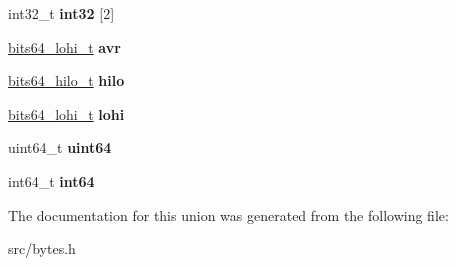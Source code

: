\begin{DoxyCompactItemize}
\item 
int32\+\_\+t {\bfseries int32} \mbox{[}2\mbox{]}\hypertarget{unionbits64__s_a5a6e3c19e144a66c4923c3ea47d9bb23}{}\label{unionbits64__s_a5a6e3c19e144a66c4923c3ea47d9bb23}

\item 
\hyperlink{structbits64__lohi__s}{bits64\+\_\+lohi\+\_\+t} {\bfseries avr}\hypertarget{unionbits64__s_a6b815502e09f58865868c040d132d809}{}\label{unionbits64__s_a6b815502e09f58865868c040d132d809}

\item 
\hyperlink{structbits64__hilo__s}{bits64\+\_\+hilo\+\_\+t} {\bfseries hilo}\hypertarget{unionbits64__s_acd5f277340bd777ff42bcc13c52c6081}{}\label{unionbits64__s_acd5f277340bd777ff42bcc13c52c6081}

\item 
\hyperlink{structbits64__lohi__s}{bits64\+\_\+lohi\+\_\+t} {\bfseries lohi}\hypertarget{unionbits64__s_a2d07870fec9fb72486013721a461acc1}{}\label{unionbits64__s_a2d07870fec9fb72486013721a461acc1}

\item 
uint64\+\_\+t {\bfseries uint64}\hypertarget{unionbits64__s_a82a89fa3451230cc4c2717eeb8c03160}{}\label{unionbits64__s_a82a89fa3451230cc4c2717eeb8c03160}

\item 
int64\+\_\+t {\bfseries int64}\hypertarget{unionbits64__s_a180519c6f448161cf94b2f4b43555595}{}\label{unionbits64__s_a180519c6f448161cf94b2f4b43555595}

\end{DoxyCompactItemize}


The documentation for this union was generated from the following file\+:\begin{DoxyCompactItemize}
\item 
src/bytes.\+h\end{DoxyCompactItemize}
